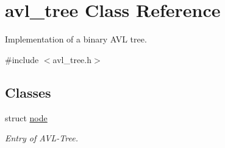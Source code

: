 \hypertarget{classavl__tree}{\section{avl\-\_\-tree Class Reference}
\label{classavl__tree}
}


Implementation of a binary A\-V\-L tree.  




{\ttfamily \#include $<$avl\-\_\-tree.\-h$>$}

\subsection*{Classes}
\begin{DoxyCompactItemize}
\item 
struct \hyperlink{structavl__tree_1_1node}{node}
\begin{DoxyCompactList}\small\item\em Entry of A\-V\-L-\/\-Tree. \end{DoxyCompactList}\end{DoxyCompactItemize}
